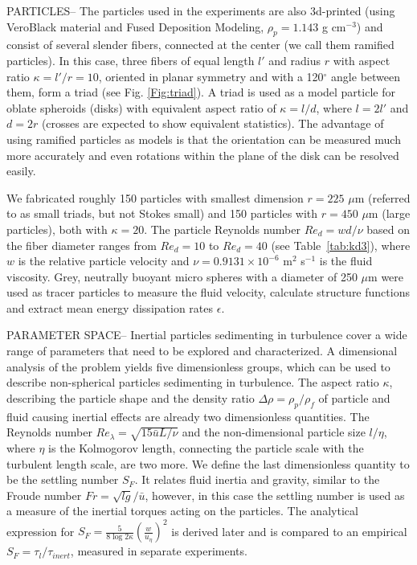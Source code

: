 \documentclass[]{jfm}
\begin{document}
PARTICLES--  The particles used in the experiments are also 3d-printed (using VeroBlack material and Fused Deposition Modeling, $\rho_p=1.143$ g cm$^{-3}$) and consist of several slender fibers, connected at the center (we call them ramified particles).  In this case, three fibers of equal length $l'$ and radius $r$ with aspect ratio $\kappa=l'/r=10$, oriented in planar symmetry and with a 120$^{\circ}$ angle between them, form a triad (see Fig. \ref{Fig:triad}).  A triad is used as a model particle for oblate spheroids (disks) with equivalent aspect ratio of $\kappa=l/d$, where $l=2l'$ and $d=2r$ (crosses are expected to show equivalent statistics).  The advantage of using ramified particles as models is that the orientation can be measured much more accurately and even rotations within the plane of the disk can be resolved easily.  

We fabricated roughly 150 particles with smallest dimension $r=225$ $\mu$m (referred to as small triads, but not Stokes small) and 150 particles with $r=450$ $\mu$m (large particles), both with $\kappa=20$.  The particle Reynolds number $\textit{Re}_d = wd/\nu$ based on the fiber diameter ranges from $\textit{Re}_d=10$ to $\textit{Re}_d=40$ (see Table~\ref{tab:kd3}), where $w$ is the relative particle velocity and $\nu=0.9131 \times 10^{-6}$ m$^{2}$ s$^{-1}$ is the fluid viscosity.  Grey, neutrally buoyant micro spheres with a diameter of 250 $\mu$m were used as tracer particles to measure the fluid velocity, calculate structure functions and extract mean energy dissipation rates $\epsilon$. 

PARAMETER SPACE-- Inertial particles sedimenting in turbulence cover a wide range of parameters that need to be explored and characterized.  A dimensional analysis of the problem yields five dimensionless groups, which can be used to describe non-spherical particles sedimenting in turbulence. The aspect ratio $\kappa$, describing the particle shape and the density ratio $\Delta \rho= \rho_p/\rho_f$ of particle and fluid causing inertial effects are already two dimensionless quantities.  The Reynolds number $\textit{Re}_{\lambda}=\sqrt{15\bar{u}L/\nu}$ and the non-dimensional particle size $l/\eta$, where $\eta$ is the Kolmogorov length, connecting the particle scale with the turbulent length scale, are two more.  We define the last dimensionless quantity to be the settling number $S_F$.  It relates fluid inertia and gravity, similar to the Froude number $\textit{Fr}=\sqrt{lg}/\bar{u}$, however, in this case the settling number is used as a measure of the inertial torques acting on the particles.  The analytical expression for $S_F{=}\frac{5}{8\log{2\kappa}}(\frac{w}{u_{\eta}})^2$ is derived later and is compared to an empirical $S_F=\tau_l/\tau_{\textit{inert}}$, measured in separate experiments. 
\end{document}
